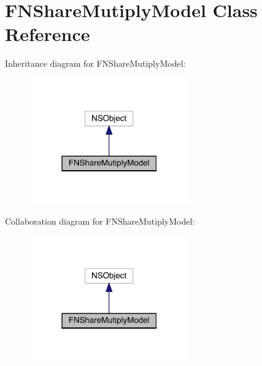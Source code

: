 \hypertarget{interface_f_n_share_mutiply_model}{}\section{F\+N\+Share\+Mutiply\+Model Class Reference}
\label{interface_f_n_share_mutiply_model}


Inheritance diagram for F\+N\+Share\+Mutiply\+Model\+:\nopagebreak
\begin{figure}[H]
\begin{center}
\leavevmode
\includegraphics[width=195pt]{interface_f_n_share_mutiply_model__inherit__graph}
\end{center}
\end{figure}


Collaboration diagram for F\+N\+Share\+Mutiply\+Model\+:\nopagebreak
\begin{figure}[H]
\begin{center}
\leavevmode
\includegraphics[width=195pt]{interface_f_n_share_mutiply_model__coll__graph}
\end{center}
\end{figure}
